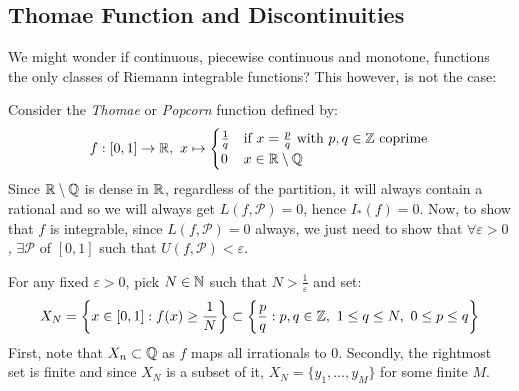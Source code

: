 \documentclass[../main.tex]{subfiles}
\begin{document}
\subsection{Thomae Function and Discontinuities}
We might wonder if continuous, piecewise continuous and monotone, functions the only classes of Riemann integrable functions?
This however, is not the case:
\begin{example}
  Consider the \textit{Thomae} or \textit{Popcorn} function defined by:
  \[
    f: [0, 1] \to \mathbb{R},\ x \mapsto \begin{cases}
    \frac{1}{q} & \text{if } x = \frac{p}{q} \text{ with } p, q \in \mathbb{Z} \text{ coprime} \\
    0 & x \in \mathbb{R} \setminus \mathbb{Q}
    \end{cases}
  \]
  Since $\mathbb{R} \setminus \mathbb{Q}$ is dense in $\mathbb{R}$, regardless of the partition, it will always contain a rational and so we will always get $L(f, \mathcal{P}) = 0$, hence $I_*(f) = 0$.
  Now, to show that $f$ is integrable, since $L(f, \mathcal{P}) = 0$ always, we just need to show that $\forall \varepsilon > 0$, $\exists \mathcal{P}$ of $[0, 1]$ such that $U(f, \mathcal{P}) < \varepsilon$.

  For any fixed $\varepsilon > 0$, pick $N \in \mathbb{N}$ such that $N > \frac{1}{\varepsilon}$ and set:
  \[
    X_N = \left\{x \in [0, 1]: f(x) \geq \frac{1}{N}\right\} \subset \left\{\frac{p}{q}: p, q \in \mathbb{Z},\ 1 \leq q \leq N,\ 0 \leq p \leq q\right\}
  \]
  First, note that $X_n \subset \mathbb{Q}$ as $f$ maps all irrationals to $0$.
  Secondly, the rightmost set is finite and since $X_N$ is a subset of it, $X_N = \{y_1, \ldots, y_M\}$ for some finite $M$.


\end{example}
\end{document}
